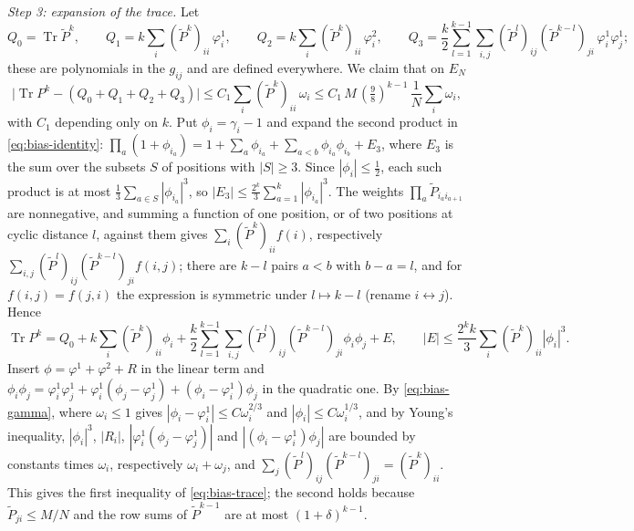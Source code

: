 \documentclass[11pt,a4paper]{article}
\makeatletter
\theoremstyle{stmt}
\theoremstyle{defn}
\theoremstyle{rmk}
\renewenvironment{proof}[1][\proofname]{\par\pushQED{\qed}\normalfont\topsep6\p@\@plus6\p@\relax
  \trivlist\item[\hskip\labelsep{\sffamily\itshape\small #1.}]\ignorespaces}{\popQED\endtrivlist\@endpefalse}
\numberwithin{equation}{section}
\DeclareMathOperator{\Tr}{Tr}
\makeatother
\begin{document}
{\begin{proof}
\emph{Step 3: expansion of the trace.} Let
\[
Q_0=\Tr\tilde P^k,\qquad Q_1=k\sum_i(\tilde P^k)_{ii}\,\varphi^1_i,\qquad Q_2=k\sum_i(\tilde P^k)_{ii}\,\varphi^2_i,\qquad Q_3=\frac k2\sum_{l=1}^{k-1}\sum_{i,j}(\tilde P^l)_{ij}(\tilde P^{k-l})_{ji}\,\varphi^1_i\varphi^1_j ;
\]
these are polynomials in the $g_{ij}$ and are defined everywhere. We claim that on $E_N$
\begin{equation}\label{eq:bias-trace}
\big|\Tr P^k-(Q_0+Q_1+Q_2+Q_3)\big|\le C_1\sum_i(\tilde P^k)_{ii}\,\omega_i\le C_1\,M\,(\tfrac98)^{k-1}\,\frac1N\sum_i\omega_i ,
\end{equation}
with $C_1$ depending only on $k$. Put $\phi_i=\gamma_i-1$ and expand the second product in \eqref{eq:bias-identity}: $\prod_a(1+\phi_{i_a})=1+\sum_a\phi_{i_a}+\sum_{a<b}\phi_{i_a}\phi_{i_b}+E_3$, where $E_3$ is the sum over the subsets $S$ of positions with $|S|\ge3$. Since $|\phi_i|\le\frac12$, each such product is at most $\frac13\sum_{a\in S}|\phi_{i_a}|^3$, so $|E_3|\le\frac{2^k}{3}\sum_{a=1}^k|\phi_{i_a}|^3$. The weights $\prod_a\tilde P_{i_ai_{a+1}}$ are nonnegative, and summing a function of one position, or of two positions at cyclic distance $l$, against them gives $\sum_i(\tilde P^k)_{ii}f(i)$, respectively $\sum_{i,j}(\tilde P^l)_{ij}(\tilde P^{k-l})_{ji}f(i,j)$; there are $k-l$ pairs $a<b$ with $b-a=l$, and for $f(i,j)=f(j,i)$ the expression is symmetric under $l\mapsto k-l$ (rename $i\leftrightarrow j$). Hence
\[
\Tr P^k=Q_0+k\sum_i(\tilde P^k)_{ii}\phi_i+\frac k2\sum_{l=1}^{k-1}\sum_{i,j}(\tilde P^l)_{ij}(\tilde P^{k-l})_{ji}\phi_i\phi_j+E,\qquad|E|\le\frac{2^kk}{3}\sum_i(\tilde P^k)_{ii}|\phi_i|^3 .
\]
Insert $\phi=\varphi^1+\varphi^2+R$ in the linear term and $\phi_i\phi_j=\varphi^1_i\varphi^1_j+\varphi^1_i(\phi_j-\varphi^1_j)+(\phi_i-\varphi^1_i)\phi_j$ in the quadratic one. By \eqref{eq:bias-gamma}, where $\omega_i\le1$ gives $|\phi_i-\varphi^1_i|\le C\omega_i^{2/3}$ and $|\phi_i|\le C\omega_i^{1/3}$, and by Young's inequality, $|\phi_i|^3$, $|R_i|$, $|\varphi^1_i(\phi_j-\varphi^1_j)|$ and $|(\phi_i-\varphi^1_i)\phi_j|$ are bounded by constants times $\omega_i$, respectively $\omega_i+\omega_j$, and $\sum_j(\tilde P^l)_{ij}(\tilde P^{k-l})_{ji}=(\tilde P^k)_{ii}$. This gives the first inequality of \eqref{eq:bias-trace}; the second holds because $\tilde P_{ji}\le M/N$ and the row sums of $\tilde P^{k-1}$ are at most $(1+\delta)^{k-1}$.


\end{proof}}
\end{document}
